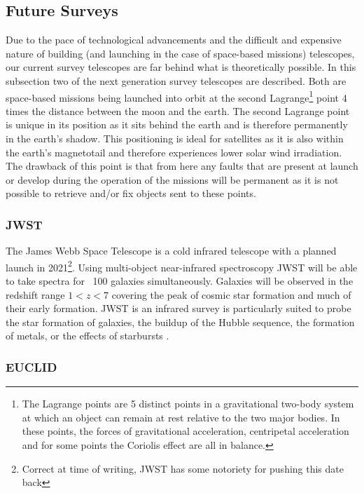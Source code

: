 \subsection{Future Surveys}

Due to the pace of technological advancements and the difficult and expensive nature of building (and launching in the case of space-based missions) telescopes, our current survey telescopes are far behind what is theoretically possible. In this subsection two of the next generation survey telescopes are described. Both are space-based missions being launched into orbit at the second Lagrange\footnote{The Lagrange points are 5 distinct points in a gravitational two-body system at which an object can remain at rest relative to the two major bodies. In these points, the forces of gravitational acceleration, centripetal acceleration and for some points the Coriolis effect are all in balance.} point 4 times the distance between the moon and the earth. The second Lagrange point is unique in its position as it sits behind the earth and is therefore permanently in the earth's shadow. This positioning is ideal for satellites as it is also within the earth's magnetotail and therefore experiences lower solar wind irradiation. The drawback of this point is that from here any faults that are present at launch or develop during the operation of the missions will be permanent as it is not possible to retrieve and/or fix objects sent to these points.

\subsubsection{JWST \cite{JamesNASA}}

The James Webb Space Telescope is a cold infrared telescope with a planned launch in 2021\footnote{Correct at time of writing, JWST has some notoriety for pushing this date back}. Using multi-object near-infrared spectroscopy JWST will be able to take spectra for ~100 galaxies simultaneously. Galaxies will be observed in the redshift range $1 < z < 7$ covering the peak of cosmic star formation and much of their early formation. JWST is an infrared survey is particularly suited to probe the star formation of galaxies, the buildup of the Hubble sequence, the formation of metals, or the effects of starbursts \cite{Windhorst2009JWST2009}.  


\subsubsection{EUCLID}

